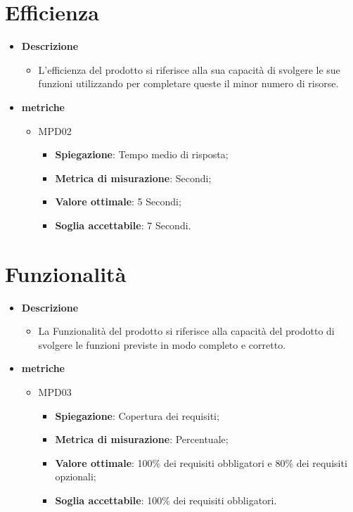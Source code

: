 \section{Efficienza}
\begin{itemize}
    \item \textbf{Descrizione}
    \begin{itemize}
        \item L'efficienza del prodotto si riferisce alla sua capacità di svolgere le sue funzioni utilizzando per completare queste il minor numero di risorse.
    \end{itemize}
    
    \item \textbf{metriche}
    \begin{itemize}
        \item MPD02
        \begin{itemize}
\item \textbf{Spiegazione}: Tempo medio di risposta;
        \item \textbf{Metrica di misurazione}: Secondi;
        \item \textbf{Valore ottimale}: 5 Secondi;
        \item \textbf{Soglia accettabile}: 7 Secondi.
        \end{itemize}
    \end{itemize}
    \end{itemize}

\section{Funzionalità}
\begin{itemize}
    \item \textbf{Descrizione}
    \begin{itemize}
        \item La Funzionalità del prodotto si riferisce alla capacità del prodotto di svolgere le funzioni previste in modo completo e corretto.
    \end{itemize}
    
    \item \textbf{metriche}
    \begin{itemize}
        \item MPD03
        \begin{itemize}
            \item \textbf{Spiegazione}: Copertura dei requisiti;
            \item \textbf{Metrica di misurazione}: Percentuale;
            \item \textbf{Valore ottimale}: 100\% dei requisiti obbligatori e 80\% dei requisiti opzionali;
            \item \textbf{Soglia accettabile}: 100\% dei requisiti obbligatori.
        \end{itemize}
    \end{itemize}
    \end{itemize}
    
